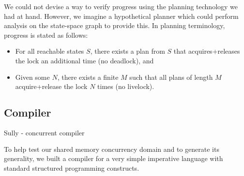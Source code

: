\begin{enumerate}
		We could not devise a way to verify progress using the planning technology we had at hand. However, we imagine a hypothetical planner which could perform analysis on the state-space graph to provide this. In planning terminology, progress is stated as follows:
		\begin{itemize}
			\item For all reachable states $S$, there exists a plan from $S$ that acquires+releases the lock an additional time (no deadlock), and
			\item Given some $N$, there exists a finite $M$ such that all plans of length $M$ acquire+release the lock $N$ times (no livelock).
		\end{itemize}
\end{enumerate}

\subsection{Compiler}
Sully - concurrent compiler


To help test our shared memory concurrency domain and to generate its
generality, we built a compiler for a very simple imperative language
with standard structured programming constructs.
